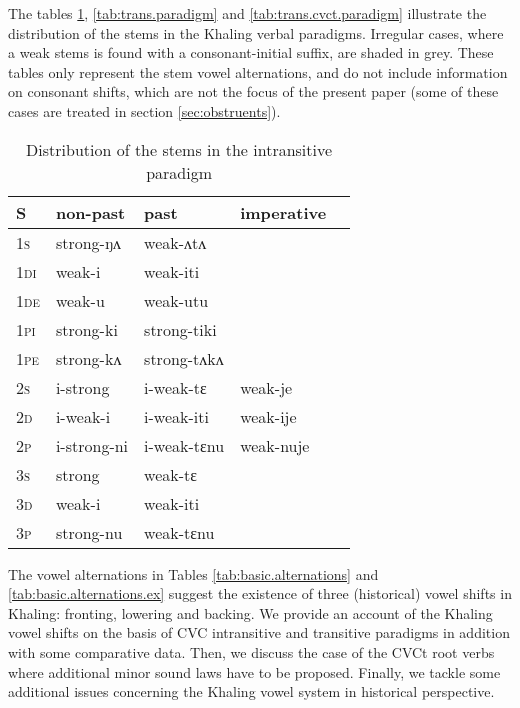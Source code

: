 \documentclass[oldfontcommands,oneside,a4paper,11pt]{article}
\newcommand{\ipa}[1]{{\phon \mbox{#1}}} %
\newcommand{\grise}[1]{\cellcolor{lightgray}\textbf{#1}}
\begin{document}
The tables \ref{tab:intrans.paradigm}, \ref{tab:trans.paradigm} and  \ref{tab:trans.cvct.paradigm} illustrate the distribution of the stems in the Khaling verbal paradigms. Irregular cases, where a weak stems is found with a consonant-initial suffix, are shaded in grey. These tables only represent   the stem vowel alternations, and do not include information on   consonant shifts, which are not the focus of the present paper (some of these cases are treated in section \ref{sec:obstruents}).

\begin{table}[H]
\caption{Distribution of the stems in the intransitive paradigm } \label{tab:intrans.paradigm} \centering
\begin{tabular}{lllll}
\toprule
S & non-past & past & imperative\\
\midrule
\textsc{1s} & strong-\ipa{ŋʌ} & weak-\ipa{ʌtʌ} \\
\textsc{1di} & weak-\ipa{i} & weak-\ipa{iti} \\
\textsc{1de} & weak-\ipa{u} & weak-\ipa{utu} \\
\textsc{1pi} & strong-\ipa{ki} & strong-\ipa{tiki} \\
\textsc{1pe} & strong-\ipa{kʌ} & strong-\ipa{tʌkʌ} \\
\textsc{2s} & \ipa{i}-strong & \ipa{i}-weak-\ipa{tɛ} \grise{} &weak-\ipa{je}\grise{}\\
\textsc{2d} & \ipa{i}-weak-\ipa{i} & \ipa{i}-weak-\ipa{iti} &weak-\ipa{ije} \\
\textsc{2p} & \ipa{i}-strong-\ipa{ni} & \ipa{i}-weak-\ipa{tɛnu}\grise{} &weak-\ipa{nuje}\grise{}\\
\textsc{3s} & strong & weak-\ipa{tɛ} \grise{}\\
\textsc{3d} & weak-\ipa{i} & weak-\ipa{iti} \\
\textsc{3p} & strong-\ipa{nu} & weak-\ipa{tɛnu}\grise{} \\
\bottomrule
\end{tabular}
\end{table}

The vowel alternations in Tables \ref{tab:basic.alternations} and \ref{tab:basic.alternations.ex} suggest the existence of   three (historical) vowel shifts   in Khaling: fronting, lowering and backing. We provide an account of the Khaling vowel shifts on the basis of CVC intransitive and transitive paradigms in addition with some comparative data. Then, we discuss the case of the CVCt root verbs where additional minor sound laws have to be proposed. Finally, we tackle some additional issues concerning the Khaling vowel system in historical perspective.
\end{document}

